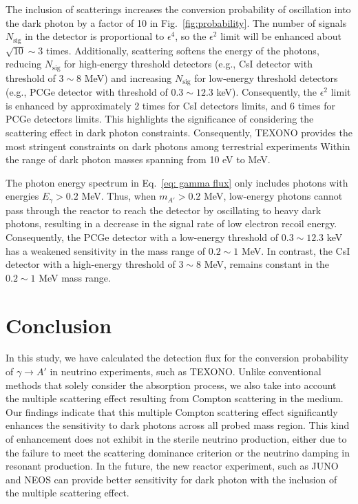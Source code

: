 \documentclass[prd,showpacs,preprintnumbers,amsmath,amssymb,twocolumn,superscriptaddress,notitlepage]{revtex4-2}
\begin{document}
The inclusion of scatterings increases the conversion probability of oscillation into the dark photon by a factor of 10 in Fig.~\ref{fig:probability}. 
The number of signals $N_{\text{sig}}$ in the detector is proportional to $\epsilon^4$, 
so the $\epsilon^2$ limit will be enhanced about $\sqrt{10} \sim 3$ times. 
Additionally, scattering softens the energy of the photons, 
reducing $N_{\text{sig}}$ for high-energy threshold detectors (e.g., CsI detector with threshold of $3 \sim 8$ MeV) 
and increasing $N_{\text{sig}}$ for low-energy threshold detectors (e.g., PCGe detector with threshold of $0.3 \sim 12.3$ keV). 
Consequently, the $\epsilon^2$ limit is enhanced by approximately 2 times for CsI detectors limits, and 6 times for PCGe detectors limits. This highlights the significance of considering the scattering effect in dark photon constraints. Consequently, TEXONO provides the most stringent constraints on dark photons among terrestrial experiments \cite{Jaeckel:2010xx,Schwarz:2015lqa,Banerjee:2019pds, Fabbrichesi:2020wbt} 
Within the range of dark photon masses spanning from 10 eV to MeV. 

The photon energy spectrum in Eq.~\eqref{eq: gamma flux} only includes photons with energies $E_\gamma>0.2$ MeV. 
Thus, when $m_{A'}>0.2$ MeV, low-energy photons cannot pass through the reactor to reach the detector by oscillating to heavy dark photons, resulting in a decrease in the signal rate of low electron recoil energy. 
Consequently, the PCGe detector with a low-energy threshold of $0.3 \sim 12.3$ keV has a weakened sensitivity in the mass range of $0.2 \sim 1$ MeV. In contrast, the CsI detector with a high-energy threshold of $3 \sim 8$ MeV, remains constant in the $0.2 \sim 1$ MeV mass range.
\\

\section{Conclusion}

In this study, we have calculated  the detection flux for the conversion probability of $\gamma \to A'$ in neutrino experiments, such as TEXONO. Unlike conventional methods that solely consider the absorption process, we also take into account the multiple scattering effect resulting from Compton scattering in the medium. Our findings indicate that this multiple Compton scattering effect significantly enhances the sensitivity to dark photons across all probed mass region. This kind of enhancement does not exhibit in the sterile neutrino production, either due to the failure to meet the scattering dominance criterion or the neutrino damping in resonant production.
In the future, the new reactor experiment, such as JUNO \cite{JUNO:2015zny} and NEOS \cite{NEOS:2015dzs} can provide better sensitivity for dark photon with the inclusion of the multiple scattering effect.
\\
\end{document}
